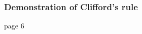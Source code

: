 \label{columns}
\begin{frame}\frametitle{Demonstration of Clifford’s rule }

page 6



% 
%  
% 
% 
% 
%  

\end{frame}

